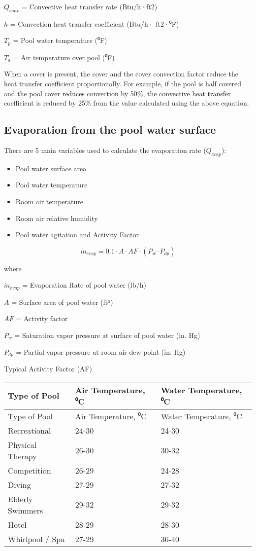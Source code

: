 \(Q_{conv}\) = Convective heat transfer rate (Btu/h·ft2)

\(h\) = Convection heat transfer coefficient (Btu/h· ft2·⁰F)

\(T_p\) = Pool water temperature (⁰F)

\(T_a\) = Air temperature over pool (⁰F)

When a cover is present, the cover and the cover convection factor reduce the heat transfer coefficient proportionally. For example, if the pool is half covered and the pool cover reduces convection by 50\%, the convective heat transfer coefficient is reduced by 25\% from the value calculated using the above equation.

\subsection{Evaporation from the pool water surface}\label{evaporation-from-the-pool-water-surface}

There are 5 main variables used to calculate the evaporation rate (\(Q_{evap}\)):

\begin{itemize}
\tightlist
\item
  Pool water surface area
\item
  Pool water temperature
\item
  Room air temperature
\item
  Room air relative humidity
\item
  Pool water agitation and Activity Factor
\end{itemize}

\begin{equation}
\dot{m}_{evap} = 0.1 \cdot A \cdot AF \cdot (P_w – P_{dp})
\end{equation}

where

\(\dot{m}_{evap}\) = Evaporation Rate of pool water (lb/h)

\(A\) = Surface area of pool water (ft²)

\(AF\) = Activity factor

\(P_w\) = Saturation vapor pressure at surface of pool water (in. Hg)

\(P_{dp}\) = Partial vapor pressure at room air dew point (in. Hg)

Typical Activity Factor (AF)

\begin{longtable}[c]{@{}lll@{}}
\toprule 
Type of Pool & Air Temperature, ⁰C & Water Temperature, ⁰C \tabularnewline
\midrule
\endfirsthead

\toprule 
Type of Pool & Air Temperature, ⁰C & Water Temperature, ⁰C \tabularnewline
\midrule
\endhead

Recreational & 24-30 & 24-30 \tabularnewline
Physical Therapy & 26-30 & 30-32 \tabularnewline
Competition & 26-29 & 24-28 \tabularnewline
Diving & 27-29 & 27-32 \tabularnewline
Elderly Swimmers & 29-32 & 29-32 \tabularnewline
Hotel & 28-29 & 28-30 \tabularnewline
Whirlpool / Spa & 27-29 & 36-40 \tabularnewline
\bottomrule
\end{longtable}

